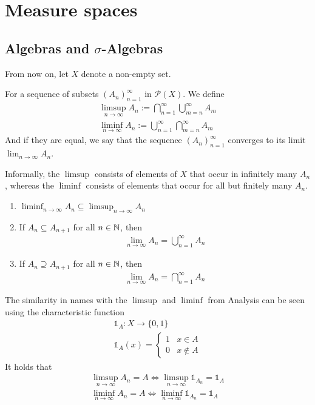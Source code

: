 \section{Measure spaces}

\subsection{Algebras and $\sigma$-Algebras}
From now on, let $X$ denote a non-empty set.

\begin{dfn}[]
  For a sequence of subsets $\left(A_{n}\right)_{n = 1}^{\infty}$ in $\mathcal{P}(X)$. We define
\begin{align*}
  \limsup_{n \to \infty}A_n := \bigcap_{n=1}^{\infty} \bigcup_{m=n}^{\infty}A_m\\
  \liminf_{n \to \infty}A_n := \bigcup_{n=1}^{\infty} \bigcap_{m=n}^{\infty}A_m
\end{align*}
And if they are equal, we say that the sequence $\left(A_{n}\right)_{n = 1}^{\infty}$ converges to its limit $\lim_{n \to \infty} A_n$.
\end{dfn}

Informally, the $\limsup$ consists of elements of $X$ that occur in infinitely many $A_n$, whereas the $\liminf$ consists of elements that occur for all but finitely many $A_n$.


\begin{rem}[]
  \begin{enumerate}
    \item $\liminf_{n \to \infty}A_n \subseteq \limsup_{n \to \infty}A_n$
    \item If $A_n \subseteq A_{n+1}$ for all $n \in \mathbb{N}$, then
      \begin{align*}
        \lim_{n \to \infty}A_n = \bigcup_{n=1}^{\infty}A_n
      \end{align*}
    \item If $A_n \supseteq A_{n+1}$ for all $n \in \mathbb{N}$, then
      \begin{align*}
        \lim_{n \to \infty}A_n = \bigcap_{n=1}^{\infty}A_n
      \end{align*}
  \end{enumerate}
  The similarity in names with the $\limsup$ and $\liminf$ from Analysis can be seen using the characteristic function 
  \begin{align*}
    \mathds{1}_A: X \to \{0,1\}\\
    \mathds{1}_A(x) = \left\{\begin{array}{ll}
      1 & x \in A \\
      0 & x \notin A
    \end{array} \right.
  \end{align*}
  It holds that
  \begin{align*}
    \limsup_{n \to \infty}A_n = A \iff \limsup_{n \to \infty} \mathds{1}_{A_n} = \mathds{1}_A\\
    \liminf_{n \to \infty}A_n = A \iff \liminf_{n \to \infty} \mathds{1}_{A_n} = \mathds{1}_A
  \end{align*}
\end{rem}

